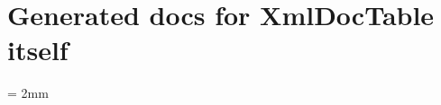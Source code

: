 \documentclass[oneside,11pt]{article}
\begin{document}
	\section{Generated docs for XmlDocTable itself}
	\tabulinesep = 2mm
	\newcommand{\xdtbeforeclasses}{\subsection{Classes!}}
	\newcommand{\xdtbeforemembers}{\subsection{Members!}}
	\newcommand{\xdtbeforemembersof}[1]{\subsubsection{Members of \texttt{#1}}}
	\newcommand{\xdtClasses}{Classes}
	\newcommand{\xdtFields}{Fields}
	\newcommand{\xdtProperties}{Properties}
	\newcommand{\xdtMethods}{Methods}
	\newcommand{\xdtMemberName}{Name}
	\newcommand{\xdtModifiers}{Modifiers}
	\newcommand{\xdtType}{Type}
	\newcommand{\xdtReturnType}{Return Type}
	\newcommand{\xdtAccessors}{Accessors}
	\newcommand{\xdtParameters}{Parameters}
	\newcommand{\xdtDescription}{Description}
	
\end{document}
